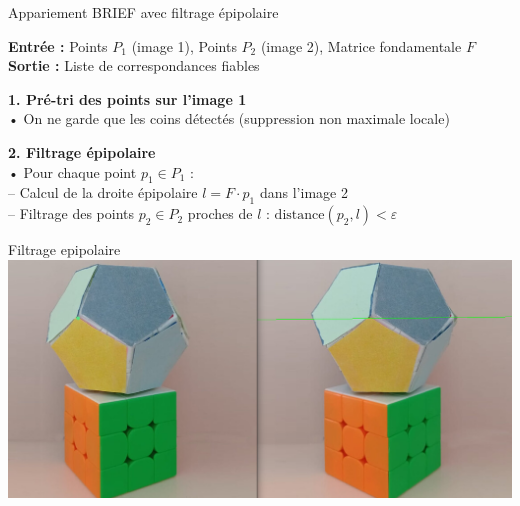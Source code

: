 \begin{frame}{Appariement BRIEF avec filtrage épipolaire}
\scriptsize

\textbf{Entrée :} Points $P_1$ (image 1), Points $P_2$ (image 2), Matrice fondamentale $F$ \\
\textbf{Sortie :} Liste de correspondances fiables

\pause
\vspace{0.3em}
\textbf{1. Pré-tri des points sur l'image 1} \\
\hspace{1em}• On ne garde que les coins détectés (suppression non maximale locale)

\pause
\vspace{0.3em}
\textbf{2. Filtrage épipolaire} \\
\hspace{1em}• Pour chaque point $p_1 \in P_1$ : \\
\hspace{2em}– Calcul de la droite épipolaire $l = F \cdot p_1$ dans l'image 2 \\
\hspace{2em}– Filtrage des points $p_2 \in P_2$ proches de $l$ : $\text{distance}(p_2, l) < \varepsilon$
\end{frame}


\begin{frame}{Filtrage epipolaire}
  \includegraphics[width=\linewidth]{capture/corresp.png}\\[0.5em]
\end{frame}


